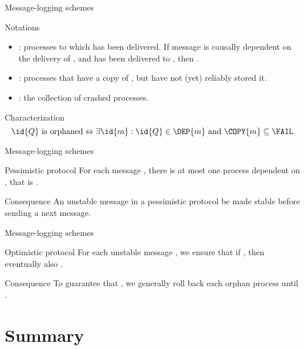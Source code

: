  \begin{slide}{Message-logging schemes}
    \begin{block}{Notations}
      \begin{itemize}
      \item {}: processes to which  has been delivered. If message  is causally dependent
        on the delivery of , and  has been delivered to , then .
      \item {}: processes that have a copy of , but have not (yet) reliably stored it.
      \item \FAIL: the collection of crashed processes.
      \end{itemize}
    \end{block}
    \begin{alertblock}{Characterization}
      \[ 
      \id{Q} \mbox{\ is orphaned} \Leftrightarrow \exists \id{m}: \id{Q} \in \DEP{m} \mbox{\ and\ } \COPY{m}
      \subseteq \FAIL
      \]
    \end{alertblock}
  \end{slide}
  \begin{slide}{Message-logging schemes}
    \begin{block}{Pessimistic protocol} 
      For each  message , there is at most one process dependent on , that is
      .
    \end{block}
    \begin{alertblock}{Consequence} 
      An unstable message in a pessimistic protocol  be made stable before sending a next message.
    \end{alertblock}
  \end{slide}
  \begin{slide}{Message-logging schemes}
    \begin{block}{Optimistic protocol} 
      For each unstable message , we ensure that if , then eventually
      also .
    \end{block}
    \begin{alertblock}{Consequence} 
      To guarantee that , we generally roll back each orphan process 
      until .
    \end{alertblock}
  \end{slide}
\section{Summary}
